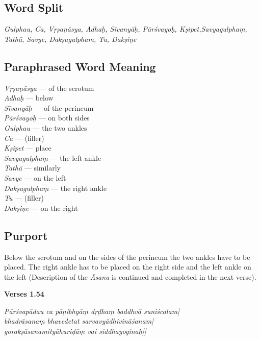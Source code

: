 \subsection*{Word Split}

\textit{Gulphau, Ca, Vṛṣaṇāsya, Adhaḥ, Sīvanyāḥ, Pārśvayoḥ, Kṣipet,Savyagulphaṃ, Tathā, Savye, Dakṣagulpham, Tu, Dakṣiṇe}
\newpage
\subsection*{Paraphrased Word Meaning}

\begin{multicols}{2}
\textit{Vṛṣaṇāsya} ---  of the scrotum \\
\textit{Adhaḥ} ---  below  \\
\textit{Sīvanyāḥ} --- of the perineum   \\
\textit{Pārśvayoḥ} ---  on both sides  \\
\textit{Gulphau} ---  the two ankles  \\
\textit{Ca} ---   (filler) \\
\textit{Kṣipet} --- place  \\
\textit{Savyagulphaṃ} --- the left ankle  \\
\textit{Tathā} ---  similarly \\
\textit{Savye} ---  on the left  \\
\textit{Dakṣagulphaṃ} ---  the right ankle  \\
\textit{Tu} ---  (filler) \\
\textit{Dakṣiṇe} --- on the right 
\end{multicols}

\subsection*{Purport}

Below the scrotum and on the sides of the perineum the two ankles have to be placed. The right ankle has to be placed on the right side and the left ankle on the left (Description of the \textit{Āsana} is continued and completed in the next verse).

\noindent \textbf{Verses 1.54}

\begin{shloka}
\textit{Pārśvapādau ca pāṇibhyāṃ dṛḍhaṃ baddhvā suniścalam|\\
bhadrāsanaṃ bhavedetat sarvavyādhivināśanam|\\
gorakṣāsanamityāhuriḍāṃ vai siddhayoginaḥ||}
\end{shloka}

